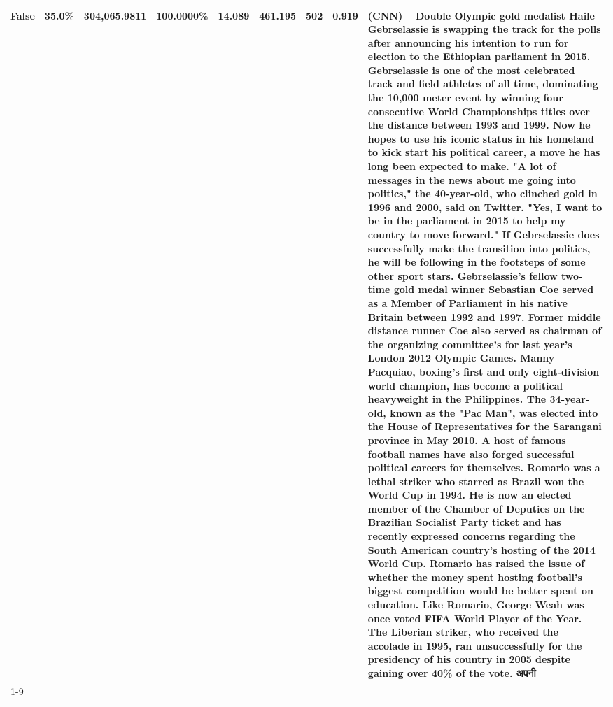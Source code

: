 \begin{table}[H]
{\begin{tabular}{lllrlllll}
False & 35.0\% & 304,065.9811 & \bfseries \color{red} 100.0000\% & 14.089 & 461.195 & 502 & 0.919 & (CNN) -- Double Olympic gold medalist Haile Gebrselassie is swapping the track for the polls after announcing his intention to run for election to the Ethiopian parliament in 2015. Gebrselassie is one of the most celebrated track and field athletes of all time, dominating the 10,000 meter event by winning four consecutive World Championships titles over the distance between 1993 and 1999. Now he hopes to use his iconic status in his homeland to kick start his political career, a move he has long been expected to make. "A lot of messages in the news about me going into politics," the 40-year-old, who clinched gold in 1996 and 2000, said on Twitter. "Yes, I want to be in the parliament in 2015 to help my country to move forward." If Gebrselassie does successfully make the transition into politics, he will be following in the footsteps of some other sport stars. Gebrselassie's fellow two-time gold medal winner Sebastian Coe served as a Member of Parliament in his native Britain between 1992 and 1997. Former middle distance runner Coe also served as chairman of the organizing committee's for last year's London 2012 Olympic Games. Manny Pacquiao, boxing's first and only eight-division world champion, has become a political heavyweight in the Philippines. The 34-year-old, known as the "Pac Man", was elected into the House of Representatives for the Sarangani province in May 2010. A host of famous football names have also forged successful political careers for themselves. Romario was a lethal striker who starred as Brazil won the World Cup in 1994. He is now an elected member of the Chamber of Deputies on the Brazilian Socialist Party ticket and has recently expressed concerns regarding the South American country's hosting of the 2014 World Cup. Romario has raised the issue of whether the money spent hosting football's biggest competition would be better spent on education. Like Romario, George Weah was once voted FIFA World Player of the Year. The Liberian striker, who received the accolade in 1995, ran unsuccessfully for the presidency of his country in 2005 despite gaining over 40\% of the vote. अपनी \\
\cline{1-9}

\end{tabular}}
\end{table}
